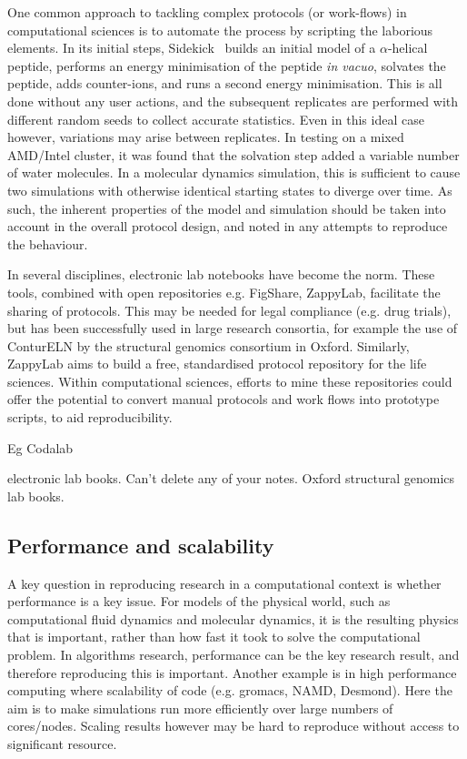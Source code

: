 \documentclass[conference]{IEEEtran}
\begin{document}
One common approach to tackling complex protocols (or work-flows) 
in computational sciences is to automate the process by scripting
the laborious elements. In its initial steps, Sidekick~\cite{Hall2014Sidekick}
builds an initial model of a $\alpha$-helical peptide, performs an
energy minimisation of the peptide \emph{in vacuo}, solvates the peptide,
adds counter-ions, and runs a second energy minimisation. This is all
done without any user actions, and the subsequent replicates are performed
with different random seeds to collect accurate statistics. Even in this 
ideal case however, variations may arise between replicates. In testing 
on a mixed AMD/Intel cluster, it was found that the solvation step added
a variable number of water molecules. In a molecular dynamics simulation, 
this is sufficient to cause two simulations with otherwise identical 
starting states to diverge over time. As such, the inherent properties
of the model and simulation should be taken into account in the overall
protocol design, and noted in any attempts to reproduce the behaviour.

In several disciplines, electronic lab notebooks have become the
norm. These tools, combined with open repositories e.g. FigShare,
ZappyLab, facilitate the sharing of protocols. This may be needed for
legal compliance (e.g. drug trials), but has been successfully used in
large research consortia, for example the use of ConturELN by the
structural genomics consortium in Oxford. Similarly, ZappyLab aims to
build a free, standardised protocol repository for the life
sciences. Within computational sciences, efforts to mine these
repositories could offer the potential to convert manual protocols and
work flows into prototype scripts, to aid reproducibility.

Eg Codalab


electronic lab books. Can't delete any of your notes. Oxford
structural genomics lab books. 

\subsection{Performance and scalability}


A key question in reproducing research in a computational context is 
whether performance is a key issue. For models of the physical world, 
such as computational fluid dynamics and molecular dynamics, it is the 
resulting physics that is important, rather than how fast it took to 
solve the computational problem. In algorithms research, performance can be
the key research result, and therefore reproducing this is important. Another 
example is in high performance computing where scalability of code (e.g. gromacs,
NAMD, Desmond). Here the aim is to make simulations run more efficiently
over large numbers of cores/nodes. Scaling results however may be 
hard to reproduce without access to significant resource.
\end{document}
